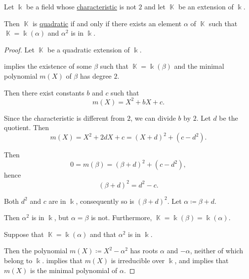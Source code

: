 \begin{proposition}\label{thm:quadratic_extension_square_root}
  Let \( \Bbbk \) be a field whose \hyperref[def:ring_characteristic]{characteristic} is not \( 2 \) and let \( \BbbK \) be an extension of \( \Bbbk \).

  Then \( \BbbK \) is \hyperref[def:field_extension_degree]{quadratic} if and only if there exists an element \( \alpha \) of \( \BbbK \) such that \( \BbbK = \Bbbk(\alpha) \) and \( \alpha^2 \) is in \( \Bbbk \).
\end{proposition}
\begin{proof}
  \SufficiencySubProof Let \( \BbbK \) be a quadratic extension of \( \Bbbk \).

   implies the existence of some \( \beta \) such that \( \BbbK = \Bbbk(\beta) \) and the minimal polynomial \( m(X) \) of \( \beta \) has degree \( 2 \).

  Then there exist constants \( b \) and \( c \) such that
  \begin{equation*}
    m(X) = X^2 + bX + c.
  \end{equation*}

  Since the characteristic is different from \( 2 \), we can divide \( b \) by \( 2 \). Let \( d \) be the quotient. Then
  \begin{equation*}
    m(X) = X^2 + 2dX + c = (X + d)^2 + (c - d^2).
  \end{equation*}

  Then
  \begin{equation*}
    0 = m(\beta) = (\beta + d)^2 + (c - d^2),
  \end{equation*}
  hence
  \begin{equation*}
    (\beta + d)^2 = d^2 - c.
  \end{equation*}

  Both \( d^2 \) and \( c \) are in \( \Bbbk \), consequently so is \( (\beta + d)^2 \). Let \( \alpha \coloneqq \beta + d \).

  Then \( \alpha^2 \) is in \( \Bbbk \), but \( \alpha = \beta \) is not. Furthermore, \( \BbbK = \Bbbk(\beta) = \Bbbk(\alpha) \).

  \NecessitySubProof Suppose that \( \BbbK = \Bbbk(\alpha) \) and that \( \alpha^2 \) is in \( \Bbbk \).

  Then the polynomial \( m(X) \coloneqq X^2 - \alpha^2 \) has roots \( \alpha \) and \( -\alpha \), neither of which belong to \( \Bbbk \).  implies that \( m(X) \) is irreducible over \( \Bbbk \), and  implies that \( m(X) \) is the minimal polynomial of \( \alpha \).
\end{proof}

